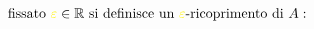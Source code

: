 \documentclass[preview]{standalone}
\begin{document}
\begin{align*}
\text{ fissato } \textcolor{yellow}{\varepsilon} \in \mathbb{R} \text{ si definisce un } \textcolor{yellow}{\varepsilon}\text{-ricoprimento di } A: \\
\end{align*}
\end{document}
